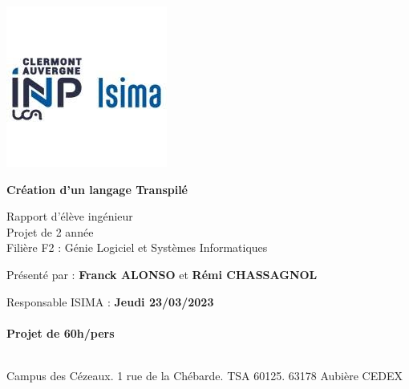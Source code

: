 \begin{titlepage}
    \includegraphics{img/logo_isima_inp.jpeg}
       \begin{center}
           \vspace*{1cm}

           \Huge
           \textbf{Création d'un langage Transpilé}

           \vspace{0.5cm}
           \LARGE
           Rapport d'élève ingénieur\\
           Projet de 2 année\\
           Filière F2 : Génie Logiciel et Systèmes Informatiques

           \vspace{1.5cm}

           Présenté par : \textbf{Franck ALONSO} et \textbf{Rémi CHASSAGNOL}

           \vfill

           \vspace{0.5cm}
         \end{center}


           \large
           \noindent
           Responsable ISIMA : \hfill \textbf{Jeudi 23/03/2023}\\~\\
           \raggedleft \textbf{Projet de 60h/pers}\\~\\
           \raggedright
           Campus des Cézeaux. 1 rue de la Chébarde. TSA 60125. 63178 Aubière CEDEX\\



   \end{titlepage}
